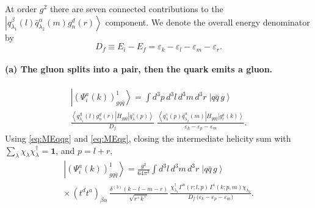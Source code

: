 \documentclass[11pt,a4paper]{article}
\numberwithin{equation}{section}
\newcommand{\eps}{\varepsilon}
\newcommand{\dg}{\dagger}
\newcommand{\dthree}{\delta^{(3)}}
\newcommand{\ket}[1]{\left|#1\right\rangle}
\newcommand{\bra}[1]{\left\langle#1\right|}
\newcommand{\Gam}{\Gamma}
\newcommand{\qk}[3]{q^{#1}_{#2}(#3)}
\newcommand{\aqk}[3]{\bar q^{#1}_{#2}(#3)}
\newcommand{\gl}[3]{g^{#1}_{#2}(#3)}
\begin{document}
At order $g^{2}$ there are seven connected contributions to the
$\ket{\qk{\beta}{\lambda_{1}}{l}\aqk{\alpha}{\lambda_{2}}{m}\gl{d}{n}{r}}$ component. We denote the
overall energy denominator by
\begin{equation}
D_{f}\equiv E_{i}-E_{f}=\eps_{k}-\eps_{l}-\eps_{m}-\eps_{r} .
\end{equation}

\paragraph{(a) The gluon splits into a pair, then the quark emits a gluon.}
\begin{center}
\end{center}
\begin{multline}
\ket{(\Psi^{a}_{i}(k))^{1}_{gq\bar q}}=\int\! d^{3}p\,d^{3}l\,d^{3}m\,d^{3}r\;
\ket{q\bar q\,g}\;
\\
\frac{\bra{\qk{\beta}{\lambda_{1}}{l}\gl{d}{n}{r}}H_{gq\bar q}\ket{\qk{\gamma}{\lambda}{p}}}{D_{f}}\;
\frac{\bra{\qk{\gamma}{\lambda}{p}\aqk{\alpha}{\lambda_{2}}{m}}H_{gq\bar q}\ket{\gl{a}{i}{k}}}
{\eps_{k}-\eps_{p}-\eps_{m}} .
\end{multline}
Using \eqref{eq:MEqqg} and \eqref{eq:MEqg}, closing the intermediate helicity sum with
$\sum_{\lambda}\chi_{\lambda}\chi^{\dg}_{\lambda}=\mathbf 1$, and $p=l+r$,
\begin{multline}
\ket{(\Psi^{a}_{i}(k))^{1}_{gq\bar q}}=\frac{g^{2}}{64\pi^{3}}\int\! d^{3}l\,d^{3}m\,d^{3}r\;
\ket{q\bar q\,g}\\
\times\,(t^{d}t^{a})_{\beta\alpha}\,\frac{\dthree(k-l-m-r)}{\sqrt{r^{+}k^{+}}}\,
\frac{\chi^{\dg}_{\lambda_{1}}\Gam^{n}(r;l,p)\,\Gam^{i}(k;p,m)\chi_{\lambda_{2}}}
{D_{f}\,\big(\eps_{k}-\eps_{p}-\eps_{m}\big)} .
\label{eq:B3a}
\end{multline}
\end{document}
